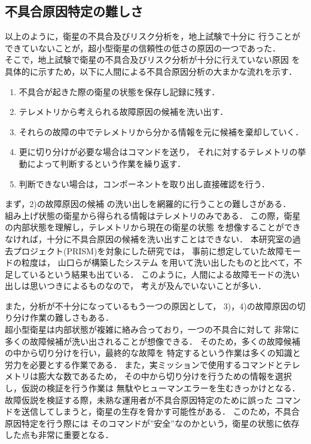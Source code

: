 \documentclass[11pt]{jsreport}
\begin{document}
\subsection{不具合原因特定の難しさ}
以上のように，衛星の不具合及びリスク分析を，地上試験で十分に
行うことができていないことが，超小型衛星の信頼性の低さの原因の一つであった．\\%
そこで，地上試験で衛星の不具合及びリスク分析が十分に行えていない原因
を具体的に示すため，以下に人間による不具合原因分析の大まかな流れを示す．
\begin{enumerate}[1)]
   \item 不具合が起きた際の衛星の状態を保存し記録に残す． 
   \item テレメトリから考えられる故障原因の候補を洗い出す．
   \item それらの故障の中でテレメトリから分かる情報を元に候補を棄却していく．
   \item 更に切り分けが必要な場合はコマンドを送り，
   それに対するテレメトリの挙動によって判断するという作業を繰り返す．
   \item 判断できない場合は，コンポーネントを取り出し直接確認を行う．
\end{enumerate}
まず，2)の故障原因の候補
の洗い出しを網羅的に行うことの難しさがある．\\
組み上げ状態の衛星から得られる情報はテレメトリのみである．
この際，衛星の内部状態を理解し，テレメトリから現在の衛星の状態
を想像することができなければ，十分に不具合原因の候補を洗い出すことはできない．
本研究室の過去プロジェクト(PRISM)を対象にした研究では，
事前に想定していた故障モードの粒度は，%
山口ら\cite{Yamaguchi2014}が構築したシステム
を用いて洗い出したものと比べて，不足しているという結果も出ている．
このように，人間による故障モードの洗い出しは思いつきによるものなので，
考えが及んでいないことが多い．

また，分析が不十分になっているもう一つの原因として，
3)，4)の故障原因の切り分け作業の難しさもある．\\
超小型衛星は内部状態が複雑に絡み合っており，一つの不具合に対して
非常に多くの故障候補が洗い出されることが想像できる．
そのため，多くの故障候補の中から切り分けを行い，最終的な故障を
特定するという作業は多くの知識と労力を必要とする作業である．
また，実ミッションで使用するコマンドとテレメトリは膨大な数であるため，
その中から切り分けを行うための情報を選択し，仮説の検証を行う作業は
無駄やヒューマンエラーを生むきっかけとなる．
故障仮説を検証する際，未熟な運用者が不具合原因特定のために誤った%
コマンドを送信してしまうと，衛星の生存を脅かす可能性がある．
このため，不具合原因特定を行う際には
そのコマンドが”安全”なのかという，衛星の状態に依存した点も非常に重要となる．
\end{document}
